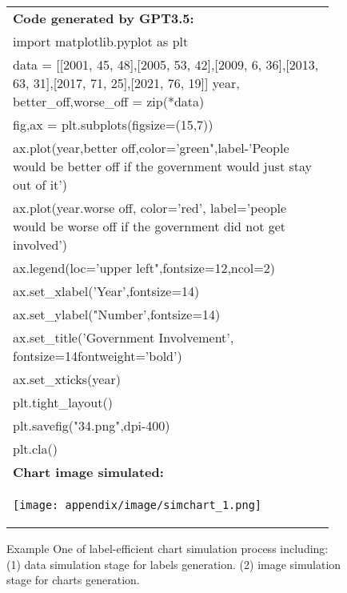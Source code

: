 \documentclass{article} \usepackage{iclr2024_conference,times}
\begin{document}
{\begin{figure}[hp]
{\begin{tabular}{p{0.95\linewidth}}
\textbf{Code generated by GPT3.5:} \\
import matplotlib.pyplot as plt\\
data = [[2001, 45, 48],[2005, 53, 42],[2009, 6, 36],[2013, 63, 31],[2017, 71, 25],[2021, 76, 19]]
year, better\_off,worse\_off = zip(*data)\\
fig,ax = plt.subplots(figsize=(15,7))\\
ax.plot(year,better off,color='green",label-'People would be better off if the government would just stay out of it')\\
ax.plot(year.worse off, color='red', label='people would be worse off if the government did not get involved')\\
ax.legend(loc='upper left",fontsize=12,ncol=2)\\
ax.set\_xlabel('Year',fontsize=14)\\
ax.set\_ylabel("Number',fontsize=14)\\
ax.set\_title('Government Involvement', fontsize=14fontweight='bold')\\
ax.set\_xticks(year)\\
plt.tight\_layout()\\
plt.savefig("34.png",dpi-400)\\
plt.cla()
\\ \midrule 
\textbf{Chart image simulated:}\\
\begin{center}
    \texttt{[image: appendix/image/simchart\_1.png]}
\end{center}
\\ \bottomrule
    \end{tabular}
    }
    \caption{Example One of label-efficient chart simulation process including: (1) data simulation stage for labels generation. (2) image simulation stage for charts generation.}
    \label{fig:simulation_1}
\end{figure}


}
\end{document}
